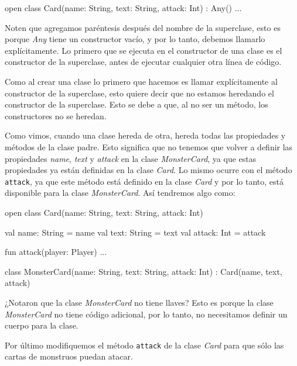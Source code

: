   \begin{kotlin}
    open class Card(name: String, text: String, attack: Int) : Any() {...}
  \end{kotlin}

  Noten que agregamos paréntesis después del nombre de la superclase, esto es porque \textit{Any}
  tiene un constructor vacío, y por lo tanto, debemos llamarlo explícitamente.
  Lo primero que se ejecuta en el constructor de una clase es el constructor de la superclase,
  antes de ejecutar cualquier otra línea de código.

  \begin{important}
    Como al crear una clase lo primero que hacemos es llamar explícitamente al constructor de la
    superclase, esto quiere decir que no estamos heredando el constructor de la superclase.
    Esto se debe a que, al no ser un método, los constructores no se heredan.
  \end{important}

  Como vimos, cuando una clase hereda de otra, hereda todas las propiedades y métodos de la clase
  padre.
  Esto significa que no tenemos que volver a definir las propiedades \textit{name}, \textit{text}
  y \textit{attack} en la clase \textit{MonsterCard}, ya que estas propiedades ya están definidas
  en la clase \textit{Card}.
  Lo mismo ocurre con el método \texttt{attack}, ya que este método está definido en la clase
  \textit{Card} y por lo tanto, está disponible para la clase \textit{MonsterCard}.
  Así tendremos algo como:

  \begin{kotlin}
    open class Card(name: String, text: String, attack: Int) {
      val name: String = name
      val text: String = text
      val attack: Int = attack

      fun attack(player: Player) {...}
    }
  \end{kotlin}

  \begin{kotlin}
    class MonsterCard(name: String, text: String, attack: Int) : Card(name, text, attack)
  \end{kotlin}

  ¿Notaron que la clase \textit{MonsterCard} no tiene llaves?
  Esto es porque la clase \textit{MonsterCard} no tiene código adicional, por lo tanto, no
  necesitamos definir un cuerpo para la clase.

  Por último modifiquemos el método \texttt{attack} de la clase \textit{Card} para que sólo las
  cartas de monstruos puedan atacar.


